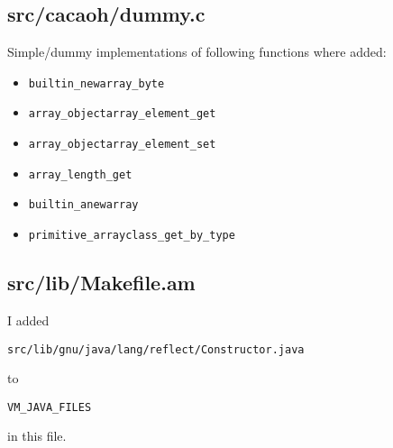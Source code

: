 \documentclass[a4paper, 10pt, titlepage]{scrartcl} %
\begin{document}
\subsection{src/cacaoh/dummy.c}
\label{sec:src/cacaoh/dummy.c}

Simple/dummy implementations of following functions where added:
\begin{itemize}
 \item \begin{scriptsize}\verb|builtin_newarray_byte|\end{scriptsize}
 \item \begin{scriptsize}\verb|array_objectarray_element_get|\end{scriptsize}
 \item \begin{scriptsize}\verb|array_objectarray_element_set|\end{scriptsize}
 \item \begin{scriptsize}\verb|array_length_get|\end{scriptsize}
 \item \begin{scriptsize}\verb|builtin_anewarray|\end{scriptsize}
 \item \begin{scriptsize}\verb|primitive_arrayclass_get_by_type|\end{scriptsize}
\end{itemize}

\subsection{src/lib/Makefile.am}
\label{sec:src/lib/Makefile.am}

I added \begin{scriptsize}\verb|src|\hspace{0.0pt}\verb|/|\hspace{0.0pt}\verb|lib|\hspace{0.0pt}\verb|/|\hspace{0.0pt}\verb|gnu|\hspace{0.0pt}\verb|/|\hspace{0.0pt}\verb|java|\hspace{0.0pt}\verb|/|\hspace{0.0pt}\verb|lang|\hspace{0.0pt}\verb|/|\hspace{0.0pt}\verb|reflect|\hspace{0.0pt}\verb|/|\hspace{0.0pt}\verb|Constructor|\hspace{0.0pt}\verb|.|\hspace{0.0pt}\verb|java|\end{scriptsize} to
\begin{scriptsize}\verb|VM_JAVA_FILES|\end{scriptsize} in this file.
\end{document}
